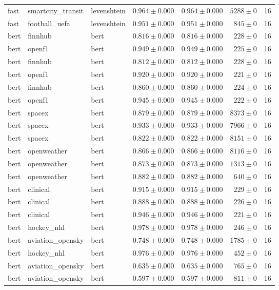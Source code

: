\begin{table}[htbp]
\begin{tabular}{l l l r r r r}
fast & smartcity\_transit & levenshtein & $0.964\pm0.000$ & $0.964\pm0.000$ & $5288\pm0$ & 16 \\
fast & football\_uefa & levenshtein & $0.951\pm0.000$ & $0.951\pm0.000$ & $845\pm0$ & 16 \\
bert & finnhub & bert & $0.816\pm0.000$ & $0.816\pm0.000$ & $228\pm0$ & 16 \\
bert & openf1 & bert & $0.949\pm0.000$ & $0.949\pm0.000$ & $225\pm0$ & 16 \\
bert & finnhub & bert & $0.812\pm0.000$ & $0.812\pm0.000$ & $228\pm0$ & 16 \\
bert & openf1 & bert & $0.920\pm0.000$ & $0.920\pm0.000$ & $221\pm0$ & 16 \\
bert & finnhub & bert & $0.860\pm0.000$ & $0.860\pm0.000$ & $224\pm0$ & 16 \\
bert & openf1 & bert & $0.945\pm0.000$ & $0.945\pm0.000$ & $222\pm0$ & 16 \\
bert & spacex & bert & $0.879\pm0.000$ & $0.879\pm0.000$ & $8373\pm0$ & 16 \\
bert & spacex & bert & $0.933\pm0.000$ & $0.933\pm0.000$ & $7966\pm0$ & 16 \\
bert & spacex & bert & $0.822\pm0.000$ & $0.822\pm0.000$ & $8151\pm0$ & 16 \\
bert & openweather & bert & $0.866\pm0.000$ & $0.866\pm0.000$ & $8116\pm0$ & 16 \\
bert & openweather & bert & $0.873\pm0.000$ & $0.873\pm0.000$ & $1313\pm0$ & 16 \\
bert & openweather & bert & $0.882\pm0.000$ & $0.882\pm0.000$ & $640\pm0$ & 16 \\
bert & clinical & bert & $0.915\pm0.000$ & $0.915\pm0.000$ & $229\pm0$ & 16 \\
bert & clinical & bert & $0.888\pm0.000$ & $0.888\pm0.000$ & $226\pm0$ & 16 \\
bert & clinical & bert & $0.946\pm0.000$ & $0.946\pm0.000$ & $221\pm0$ & 16 \\
bert & hockey\_nhl & bert & $0.978\pm0.000$ & $0.978\pm0.000$ & $246\pm0$ & 16 \\
bert & aviation\_opensky & bert & $0.748\pm0.000$ & $0.748\pm0.000$ & $1785\pm0$ & 16 \\
bert & hockey\_nhl & bert & $0.976\pm0.000$ & $0.976\pm0.000$ & $452\pm0$ & 16 \\
bert & aviation\_opensky & bert & $0.635\pm0.000$ & $0.635\pm0.000$ & $765\pm0$ & 16 \\
bert & aviation\_opensky & bert & $0.597\pm0.000$ & $0.597\pm0.000$ & $811\pm0$ & 16 \\

\end{tabular}
\end{table}
